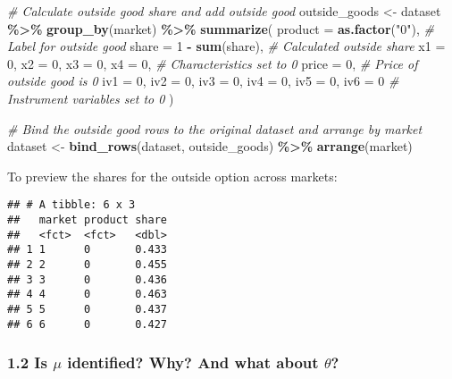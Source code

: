 \documentclass[
]{article}
\newenvironment{Shaded}{\begin{snugshade}}{\end{snugshade}}
\newcommand{\AttributeTok}[1]{\textcolor[rgb]{0.13,0.29,0.53}{#1}}
\newcommand{\CommentTok}[1]{\textcolor[rgb]{0.56,0.35,0.01}{\textit{#1}}}
\newcommand{\DecValTok}[1]{\textcolor[rgb]{0.00,0.00,0.81}{#1}}
\newcommand{\FunctionTok}[1]{\textcolor[rgb]{0.13,0.29,0.53}{\textbf{#1}}}
\newcommand{\NormalTok}[1]{#1}
\newcommand{\OtherTok}[1]{\textcolor[rgb]{0.56,0.35,0.01}{#1}}
\newcommand{\SpecialCharTok}[1]{\textcolor[rgb]{0.81,0.36,0.00}{\textbf{#1}}}
\newcommand{\StringTok}[1]{\textcolor[rgb]{0.31,0.60,0.02}{#1}}
\begin{document}
\begin{Shaded}
\begin{Highlighting}[]
\CommentTok{\# Calculate outside good share and add outside good}
\NormalTok{outside\_goods }\OtherTok{\textless{}{-}}\NormalTok{ dataset }\SpecialCharTok{\%\textgreater{}\%}
  \FunctionTok{group\_by}\NormalTok{(market) }\SpecialCharTok{\%\textgreater{}\%}
  \FunctionTok{summarize}\NormalTok{(}
    \AttributeTok{product =} \FunctionTok{as.factor}\NormalTok{(}\StringTok{"0"}\NormalTok{),  }\CommentTok{\# Label for outside good}
    \AttributeTok{share =} \DecValTok{1} \SpecialCharTok{{-}} \FunctionTok{sum}\NormalTok{(share),  }\CommentTok{\# Calculated outside share}
    \AttributeTok{x1 =} \DecValTok{0}\NormalTok{, }\AttributeTok{x2 =} \DecValTok{0}\NormalTok{, }\AttributeTok{x3 =} \DecValTok{0}\NormalTok{, }\AttributeTok{x4 =} \DecValTok{0}\NormalTok{,  }\CommentTok{\# Characteristics set to 0}
    \AttributeTok{price =} \DecValTok{0}\NormalTok{,  }\CommentTok{\# Price of outside good is 0}
    \AttributeTok{iv1 =} \DecValTok{0}\NormalTok{, }\AttributeTok{iv2 =} \DecValTok{0}\NormalTok{, }\AttributeTok{iv3 =} \DecValTok{0}\NormalTok{, }\AttributeTok{iv4 =} \DecValTok{0}\NormalTok{, }\AttributeTok{iv5 =} \DecValTok{0}\NormalTok{, }\AttributeTok{iv6 =} \DecValTok{0}  \CommentTok{\# Instrument variables set to 0}
\NormalTok{  )}

\CommentTok{\# Bind the outside good rows to the original dataset and arrange by market}
\NormalTok{dataset }\OtherTok{\textless{}{-}} \FunctionTok{bind\_rows}\NormalTok{(dataset, outside\_goods) }\SpecialCharTok{\%\textgreater{}\%}
  \FunctionTok{arrange}\NormalTok{(market)}
\end{Highlighting}
\end{Shaded}

To preview the shares for the outside option across markets:

\begin{verbatim}
## # A tibble: 6 x 3
##   market product share
##   <fct>  <fct>   <dbl>
## 1 1      0       0.433
## 2 2      0       0.455
## 3 3      0       0.436
## 4 4      0       0.463
## 5 5      0       0.437
## 6 6      0       0.427
\end{verbatim}

\subsubsection{\texorpdfstring{1.2 Is \(\mu\) identified? Why? And what
about
\(\theta\)?}{1.2 Is \textbackslash mu identified? Why? And what about \textbackslash theta?}}\label{is-mu-identified-why-and-what-about-theta}
\end{document}
